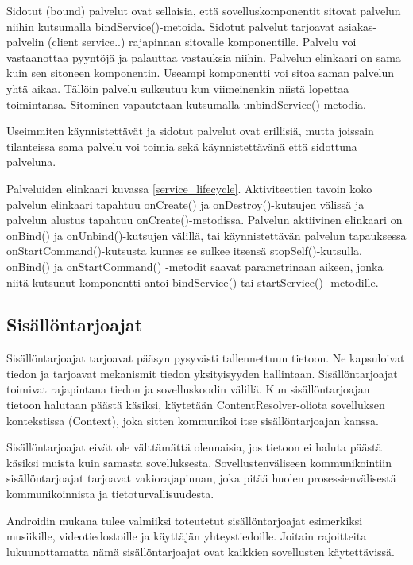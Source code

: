 Sidotut (bound) palvelut ovat sellaisia, että sovelluskomponentit sitovat palvelun niihin kutsumalla bindService()-metoida. Sidotut palvelut tarjoavat asiakas-palvelin (client service..) rajapinnan sitovalle komponentille. Palvelu voi vastaanottaa pyyntöjä ja palauttaa vastauksia niihin. Palvelun elinkaari on sama kuin sen sitoneen komponentin. Useampi komponentti voi sitoa saman palvelun yhtä aikaa. Tällöin palvelu sulkeutuu kun viimeinenkin niistä lopettaa toimintansa. Sitominen vapautetaan kutsumalla unbindService()-metodia.

Useimmiten käynnistettävät ja sidotut palvelut ovat erillisiä, mutta joissain tilanteissa sama palvelu voi toimia sekä käynnistettävänä että sidottuna palveluna. 

Palveluiden elinkaari kuvassa \ref{service_lifecycle}. Aktiviteettien tavoin koko palvelun elinkaari tapahtuu onCreate() ja onDestroy()-kutsujen välissä ja palvelun alustus tapahtuu onCreate()-metodissa. Palvelun aktiivinen elinkaari on onBind() ja onUnbind()-kutsujen välillä, tai käynnistettävän palvelun tapauksessa onStartCommand()-kutsusta kunnes se sulkee itsensä stopSelf()-kutsulla. onBind() ja onStartCommand() -metodit saavat parametrinaan aikeen, jonka niitä kutsunut komponentti antoi bindService() tai startService() -metodille. \cite{android}

\subsection{Sisällöntarjoajat}

Sisällöntarjoajat tarjoavat pääsyn pysyvästi tallennettuun tietoon. Ne kapsuloivat tiedon ja tarjoavat mekanismit tiedon yksityisyyden hallintaan. Sisällöntarjoajat toimivat rajapintana tiedon ja sovelluskoodin välillä. Kun sisällöntarjoajan tietoon halutaan päästä käsiksi, käytetään ContentResolver-oliota sovelluksen kontekstissa (Context), joka sitten kommunikoi itse sisällöntarjoajan kanssa.

Sisällöntarjoajat eivät ole välttämättä olennaisia, jos tietoon ei haluta päästä käsiksi muista kuin samasta sovelluksesta. Sovellustenväliseen kommunikointiin sisällöntarjoajat tarjoavat vakiorajapinnan, joka pitää huolen prosessienvälisestä kommunikoinnista ja tietoturvallisuudesta.

Androidin mukana tulee valmiiksi toteutetut sisällöntarjoajat esimerkiksi musiikille, videotiedostoille ja käyttäjän yhteystiedoille. Joitain rajoitteita lukuunottamatta nämä sisällöntarjoajat ovat kaikkien sovellusten käytettävissä. \cite{android}

